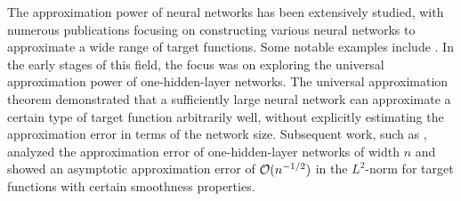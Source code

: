 \documentclass[nohyperref]{article}
\theoremstyle{plain}
\theoremstyle{definition}
\theoremstyle{remark}
\begin{document}
The approximation power of neural networks has been extensively studied, with numerous publications focusing on constructing various neural networks to approximate a wide range of target functions. Some notable examples include \cite{Cybenko1989ApproximationBS,HORNIK1989359,barron1993,yarotsky18a,yarotsky2017,doi:10.1137/18M118709X,ZHOU2019,10.3389/fams.2018.00014,2019arXiv190501208G,2019arXiv190207896G,suzuki2018adaptivity,Ryumei,Wenjing,Bao2019ApproximationAO,2019arXiv191210382L,MO,shijun:1,shijun:2,shijun:3,shijun:thesis,shijun:intrinsic:parameters,shijun:arbitrary:error:with:fixed:size}.
In the early stages of this field, the focus was on exploring the universal approximation power of one-hidden-layer networks. The universal approximation theorem \cite{Cybenko1989ApproximationBS,HORNIK1991251,HORNIK1989359} demonstrated that a sufficiently large neural network can approximate a certain type of target function arbitrarily well, without explicitly estimating the approximation error in terms of the network size.
Subsequent work, such as \cite{barron1993,barron2018approximation}, analyzed the approximation error of one-hidden-layer networks of width $n$ and showed an asymptotic approximation error of ${\mathcal{O}}(n^{-1/2})$ in the $L^2$-norm 
for target functions with certain smoothness properties.

\end{document}
